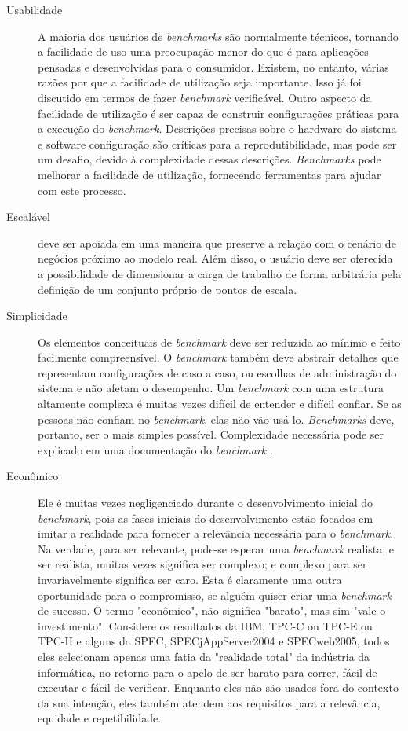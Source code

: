\begin{description}
	\item[Usabilidade] A maioria dos usuários de \textit{benchmarks} são normalmente técnicos, tornando a facilidade de uso uma preocupação menor do que é para aplicações pensadas e desenvolvidas para o consumidor. Existem, no entanto, várias razões por que a facilidade de utilização seja importante.
	Isso já foi discutido em termos de fazer \textit{benchmark} verificável. Outro aspecto da facilidade de utilização é ser capaz de construir configurações práticas para a execução do \textit{benchmark}. Descrições precisas sobre o hardware do sistema e software configuração são críticas para a reprodutibilidade, mas pode ser um desafio, devido à complexidade dessas descrições.
	\textit{Benchmarks} pode melhorar a facilidade de utilização, fornecendo ferramentas para ajudar com este processo. \cite{Kistowski2015}
	
	\item[Escalável] deve ser apoiada em uma maneira que preserve a relação com o cenário de negócios próximo ao modelo real. Além disso, o usuário deve ser oferecida a possibilidade de dimensionar a carga de trabalho de forma arbitrária pela definição de um conjunto próprio de pontos de escala. \cite{Marco2012}
	
	\item[Simplicidade] Os elementos conceituais de \textit{benchmark} deve ser reduzida ao mínimo e feito facilmente compreensível. O \textit{benchmark} também deve abstrair detalhes que representam configurações de caso a caso, ou escolhas de administração do sistema e não afetam o desempenho. \cite{Chen2014} Um \textit{benchmark} com uma estrutura altamente complexa é muitas vezes difícil de entender e difícil confiar. Se as pessoas não confiam no \textit{benchmark}, elas não vão usá-lo. \textit{Benchmarks} deve, portanto, ser o mais simples possível. Complexidade necessária pode ser explicado em uma documentação do \textit{benchmark} \cite{Weber2014}.
	
	\item[Econômico] Ele é muitas vezes negligenciado durante o desenvolvimento inicial do \textit{benchmark}, pois as fases iniciais do desenvolvimento estão focados em imitar a realidade para fornecer a relevância necessária para o \textit{benchmark}. Na verdade, para ser relevante, pode-se esperar uma \textit{benchmark} realista; e ser realista, muitas vezes significa ser complexo; e complexo para ser invariavelmente significa ser caro. Esta é claramente uma outra oportunidade para o compromisso, se alguém quiser criar uma \textit{benchmark} de sucesso. O termo "econômico", não significa "barato", mas sim "vale o investimento".
	Considere os resultados da IBM, TPC-C ou TPC-E ou TPC-H e alguns da SPEC, SPECjAppServer2004 e  SPECweb2005, todos eles selecionam apenas uma fatia da "realidade total" da indústria da informática, no retorno para o apelo de ser barato para correr, fácil de executar e fácil de verificar. Enquanto eles não são usados fora do contexto da sua intenção, eles também atendem aos requisitos para a relevância, equidade e repetibilidade. \cite{Huppler2009}
	

\end{description}
